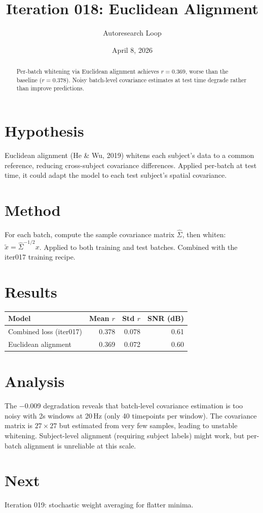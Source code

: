 \documentclass[11pt,a4paper]{article}
\title{Iteration 018: Euclidean Alignment}
\author{Autoresearch Loop}
\date{April 8, 2026}
\begin{document}
\maketitle

\begin{abstract}
Per-batch whitening via Euclidean alignment achieves $r=0.369$, worse than
the baseline ($r=0.378$). Noisy batch-level covariance estimates at test time
degrade rather than improve predictions.
\end{abstract}

\section{Hypothesis}
Euclidean alignment (He \& Wu, 2019) whitens each subject's data to a common
reference, reducing cross-subject covariance differences. Applied per-batch
at test time, it could adapt the model to each test subject's spatial covariance.

\section{Method}
For each batch, compute the sample covariance matrix $\hat{\Sigma}$, then whiten:
$\tilde{x} = \hat{\Sigma}^{-1/2} x$. Applied to both training and test batches.
Combined with the iter017 training recipe.

\section{Results}
\begin{table}[H]
\centering
\begin{tabular}{lrrr}
\toprule
Model & Mean $r$ & Std $r$ & SNR (dB) \\
\midrule
Combined loss (iter017) & 0.378 & 0.078 & 0.61 \\
Euclidean alignment & 0.369 & 0.072 & 0.60 \\
\bottomrule
\end{tabular}
\end{table}

\section{Analysis}
The $-$0.009 degradation reveals that batch-level covariance estimation is too
noisy with 2s windows at 20\,Hz (only 40 timepoints per window). The covariance
matrix is $27 \times 27$ but estimated from very few samples, leading to unstable
whitening. Subject-level alignment (requiring subject labels) might work, but
per-batch alignment is unreliable at this scale.

\section{Next}
Iteration 019: stochastic weight averaging for flatter minima.
\end{document}
